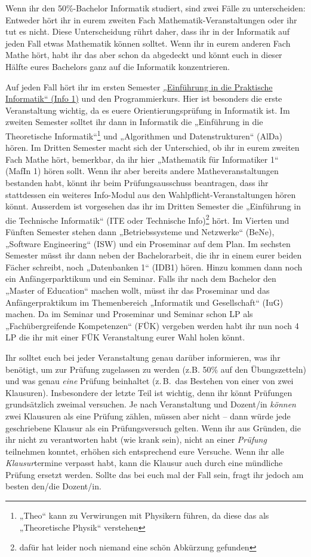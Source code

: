 Wenn ihr den 50\%-Bachelor Informatik studiert, sind zwei Fälle zu
unterscheiden: Entweder hört ihr in eurem zweiten Fach
Ma\-the\-ma\-tik-Ver\-an\-stal\-tun\-gen oder ihr tut es nicht. Diese Unterscheidung rührt
daher, dass ihr in der Informatik auf jeden Fall etwas Mathematik können
solltet. Wenn ihr in eurem anderen Fach Mathe hört, habt ihr das aber schon da
abgedeckt und könnt euch in dieser Hälfte eures Bachelors ganz auf die
Informatik konzentrieren.

Auf jeden Fall hört ihr im ersten Semester \hyperref[info1]{„Einführung in die
Praktische Informatik“ (Info 1)} und den Programmierkurs. Hier ist besonders
die erste Veranstaltung wichtig, da es euere Orientierungsprüfung in Informatik
ist. Im zweiten Semester solltet ihr dann in Informatik die „Einführung in die
Theoretische Informatik“\footnote{„Theo“ kann zu Verwirungen mit Physikern
führen, da diese das als „Theoretische Physik“ verstehen} und „Algorithmen und
Datenstrukturen“ (AlDa) hören. Im Dritten Semester macht sich der Unterschied,
ob ihr in eurem zweiten Fach Mathe hört, bemerkbar, da ihr hier
„Mathematik für Informatiker 1“ (MafIn 1)  hören sollt.  Wenn ihr aber bereits
andere Matheveranstaltungen bestanden habt, könnt ihr beim Prüfungsausschuss
beantragen, dass ihr stattdessen ein weiteres Info-Modul aus den
Wahlpflicht-Veranstaltungen hören könnt.  Ausserdem ist vorgesehen das ihr im
Dritten Semester die „Einführung in die Technische Informatik“ (ITE oder
Technische Info)\footnote{dafür hat leider noch niemand eine schön Abkürzung
gefunden} hört.  Im Vierten und Fünften Semester stehen dann „Betriebssysteme
und Netzwerke“ (BeNe), „Software Engineering“ (ISW) und ein Proseminar auf dem
Plan. Im sechsten Semester müsst ihr dann neben der Bachelorarbeit, die ihr in
einem eurer beiden Fächer schreibt, noch „Datenbanken 1“ (IDB1) hören. Hinzu
kommen dann noch ein Anfängerparktikum und ein Seminar. Falls ihr nach dem
Bachelor den „Master of Education“ machen wollt, müsst ihr das Proseminar und
das Anfängerpraktikum im Themenbereich „Informatik und Gesellschaft“ (IuG)
machen.  Da im Seminar und Proseminar und Seminar schon LP als
„Fachübergreifende Kompetenzen“ (FÜK) vergeben werden habt ihr nun noch 4 LP
die ihr mit einer FÜK Veranstaltung eurer Wahl holen könnt.

Ihr solltet euch bei jeder Veranstaltung genau darüber informieren, was ihr
benötigt, um zur Prüfung zugelassen zu werden (z.B. 50\% auf den Übungszetteln)
und was genau \emph{eine} Prüfung beinhaltet (z.\,B.\ das Bestehen von einer von
zwei Klausuren). Insbesondere der letzte Teil ist wichtig, denn ihr könnt
Prüfungen grundsätzlich zweimal versuchen. Je nach Veranstaltung und Dozent/in
\emph{können} zwei Klausuren als eine Prüfung zählen, müssen aber nicht -- dann
würde jede geschriebene Klausur als ein Prüfungsversuch gelten. Wenn ihr aus
Gründen, die ihr nicht zu verantworten habt (wie krank sein), nicht an einer
\emph{Prüfung} teilnehmen konntet, erhöhen sich entsprechend eure Versuche.
Wenn ihr alle \emph{Klausur}termine verpasst habt, kann die Klausur auch durch
eine mündliche Prüfung ersetzt werden. Sollte das bei euch mal der Fall sein,
fragt ihr jedoch am besten den/die Dozent/in.

